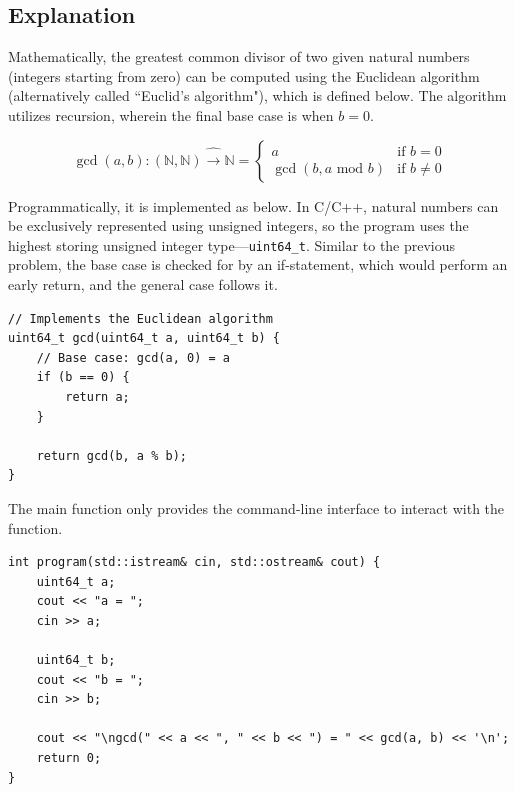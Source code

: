 \documentclass[12pt]{article}
\begin{document}
\subsection{Explanation}

Mathematically, the greatest common divisor of two given natural numbers (integers starting from zero) can be computed using the Euclidean algorithm (alternatively called ``Euclid's algorithm"), which is defined below. The algorithm utilizes recursion, wherein the final base case is when $b = 0$.

$$
\gcd(a, b) : (\mathbb{N}, \mathbb{N}) \hat \rightarrow \mathbb{N} = \begin{cases}
a & \text{if } b = 0 \\
\gcd(b, a \text{ mod } b) & \text{if } b \neq 0
\end{cases}
$$

Programmatically, it is implemented as below. In C/C++, natural numbers can be exclusively represented using unsigned integers, so the program uses the highest storing unsigned integer type---\texttt{uint64\_t}. Similar to the previous problem, the base case is checked for by an if-statement, which would perform an early return, and the general case follows it.

\begin{verbatim}
// Implements the Euclidean algorithm
uint64_t gcd(uint64_t a, uint64_t b) {
    // Base case: gcd(a, 0) = a
    if (b == 0) {
        return a;
    }

    return gcd(b, a % b);
}
\end{verbatim}

The main function only provides the command-line interface to interact with the function.

\begin{verbatim}
int program(std::istream& cin, std::ostream& cout) {
    uint64_t a;
    cout << "a = ";
    cin >> a;

    uint64_t b;
    cout << "b = ";
    cin >> b;

    cout << "\ngcd(" << a << ", " << b << ") = " << gcd(a, b) << '\n';
    return 0;
}
\end{verbatim}

\end{document}
